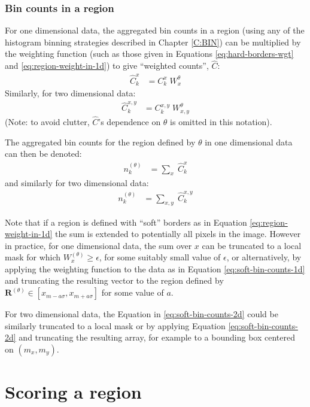 \subsubsection{Bin counts in a region}

For one dimensional data, the aggregated bin counts in a region (using any of the histogram binning strategies described in Chapter \ref{C:BIN}) can be multiplied by the weighting function (such as those given in Equations \ref{eq:hard-borders-wgt} and \ref{eq:region-weight-in-1d}) to give ``weighted counts'', $\hat{C}$:
\begin{align}
\hat{C}^x_k &= C^x_k  \; W^{\theta}_x
\end{align}
Similarly, for two dimensional data:
\begin{align}
\hat{C}^{x,y}_k &= C^{x,y}_k  \; W^{\theta}_{x,y}
\end{align}
(Note: to avoid clutter, $\hat{C}$'s dependence on $\theta$ is omitted in this notation).

The aggregated bin counts for the region defined by $\theta$ in one dimensional data can then be denoted:
\begin{align}
n_k^{(\theta)} 
&= \sum_x \; \hat{C}^x_k   
\label{eq:soft-bin-counts-1d} 
\end{align}
and similarly for two dimensional data:
\begin{align}
n_k^{(\theta)} 
&= \sum_{x,y} \; \hat{C}^{x,y}_k  \label{eq:soft-bin-counts-2d} 
\end{align}

Note that if a region is defined with ``soft'' borders as in Equation \ref{eq:region-weight-in-1d} the sum is extended to potentially all pixels in the image. However in practice, for one dimensional data, the sum over $x$ can be truncated to a local mask for which $W^{(\theta)}_x \geq \epsilon$, for some suitably small value of $\epsilon$, or alternatively, by applying the weighting function to the data as in Equation \ref{eq:soft-bin-counts-1d} and truncating the resulting vector to the region defined by $\mathbf{R}^{(\theta)} \in [x_{m-a\sigma},x_{m+a\sigma}]$ for some value of $a$.

For two dimensional data, the Equation in \ref{eq:soft-bin-counts-2d} could be similarly truncated to a local mask or by applying Equation \ref{eq:soft-bin-counts-2d} and truncating the resulting array, for example to a bounding box centered on $(m_x,m_y)$.

\section{Scoring a region}

